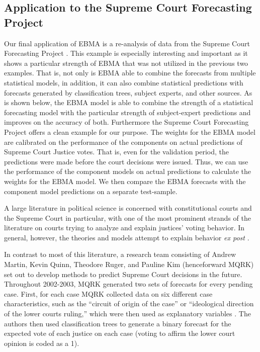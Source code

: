 \subsection{Application to the Supreme Court Forecasting Project}
Our final application of EBMA is a re-analysis of data from the
Supreme Court Forecasting Project
\citep{Ruger:2004,Martin:2004}. This example is especially
interesting and important as it shows a particular strength of EBMA
that was not utilized in the previous two examples. That is, not only
is EBMA able to combine the forecasts from multiple statistical
models, in addition, it can also combine statistical predictions with
forecasts generated by classification trees, subject experts, and
other sources. As is shown below, the EBMA model is able to combine
the strength of a statistical forecasting model with the particular
strength of subject-expert predictions and improves on the accuracy of
both. Furthermore the Supreme Court Forecasting Project offers a clean
example for our purpose. The weights for the EBMA model are calibrated
on the performance of the components on actual predictions of Supreme
Court Justice votes. That is, even for the validation period, the
predictions were made before the court decisions were issued.  Thus,
we can use the performance of the component models on actual
predictions to calculate the weights for the EBMA model.  We then
compare the EBMA forecasts with the component model predictions on a
separate test-sample.

A large literature in political science is concerned with
constitutional courts and the Supreme Court in particular, with one of
the most prominent strands of the literature on courts trying to
analyze and explain justices' voting behavior. In general, however,
the theories and models attempt to explain behavior \textit{ex post}
\citep[e.g.,][]{Hausegger_Baum_1999, Segal_Cover_1989,
  Richards_Kritzer_2002, Klein_Hume_2003, Songer_etal_1994}.

In contrast to most of this literature, a research team consisting of
Andrew Martin, Kevin Quinn, Theodore Ruger, and Pauline Kim
(henceforward MQRK) set out to develop methods to predict Supreme
Court decisions in the future.  Throughout 2002-2003, MQRK generated
two sets of forecasts for every pending case. First, for each case
MQRK collected data on six different case characteristics, such as the
``circuit of origin of the case'' or ``ideological direction of the
lower courts ruling,'' which were then used as explanatory variables
\cite[762]{Martin:2004}. The authors then used classification trees to
generate a binary forecast for the expected vote of each justice on
each case (voting to affirm the lower court opinion is coded as a
1). 

